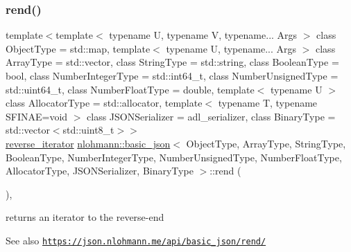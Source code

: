 \subsubsection{\texorpdfstring{rend()}{rend()}\hspace{0.1cm}{\footnotesize\ttfamily [1/2]}}
{\footnotesize\ttfamily template$<$template$<$ typename U, typename V, typename... Args $>$ class Object\+Type = std\+::map, template$<$ typename U, typename... Args $>$ class Array\+Type = std\+::vector, class String\+Type  = std\+::string, class Boolean\+Type  = bool, class Number\+Integer\+Type  = std\+::int64\+\_\+t, class Number\+Unsigned\+Type  = std\+::uint64\+\_\+t, class Number\+Float\+Type  = double, template$<$ typename U $>$ class Allocator\+Type = std\+::allocator, template$<$ typename T, typename S\+F\+I\+N\+A\+E=void $>$ class J\+S\+O\+N\+Serializer = adl\+\_\+serializer, class Binary\+Type  = std\+::vector$<$std\+::uint8\+\_\+t$>$$>$ \\
\hyperlink{classnlohmann_1_1basic__json_a5b8c0ebedd920b507f4f7ff4e19bf3c6}{reverse\+\_\+iterator} \hyperlink{classnlohmann_1_1basic__json}{nlohmann\+::basic\+\_\+json}$<$ Object\+Type, Array\+Type, String\+Type, Boolean\+Type, Number\+Integer\+Type, Number\+Unsigned\+Type, Number\+Float\+Type, Allocator\+Type, J\+S\+O\+N\+Serializer, Binary\+Type $>$\+::rend (\begin{DoxyParamCaption}{ }\end{DoxyParamCaption})\hspace{0.3cm}{\ttfamily [inline]}, {\ttfamily [noexcept]}}



returns an iterator to the reverse-\/end 

\begin{DoxySeeAlso}{See also}
\href{https://json.nlohmann.me/api/basic_json/rend/}{\tt https\+://json.\+nlohmann.\+me/api/basic\+\_\+json/rend/} 
\end{DoxySeeAlso}
\mbox{\label{classnlohmann_1_1basic__json_a2e4cbf41d593d41847b90aea55e5e84d}} 

